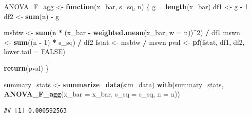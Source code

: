 \documentclass[
]{book}
\newenvironment{Shaded}{\begin{snugshade}}{\end{snugshade}}
\newcommand{\AttributeTok}[1]{\textcolor[rgb]{0.13,0.29,0.53}{#1}}
\newcommand{\ConstantTok}[1]{\textcolor[rgb]{0.56,0.35,0.01}{#1}}
\newcommand{\ControlFlowTok}[1]{\textcolor[rgb]{0.13,0.29,0.53}{\textbf{#1}}}
\newcommand{\DecValTok}[1]{\textcolor[rgb]{0.00,0.00,0.81}{#1}}
\newcommand{\FunctionTok}[1]{\textcolor[rgb]{0.13,0.29,0.53}{\textbf{#1}}}
\newcommand{\NormalTok}[1]{#1}
\newcommand{\OtherTok}[1]{\textcolor[rgb]{0.56,0.35,0.01}{#1}}
\newcommand{\SpecialCharTok}[1]{\textcolor[rgb]{0.81,0.36,0.00}{\textbf{#1}}}
\begin{document}
\begin{Shaded}
\begin{Highlighting}[]
\NormalTok{ANOVA\_F\_agg }\OtherTok{\textless{}{-}} \ControlFlowTok{function}\NormalTok{(x\_bar, s\_sq, n) \{}
\NormalTok{  g }\OtherTok{=} \FunctionTok{length}\NormalTok{(x\_bar)}
\NormalTok{  df1 }\OtherTok{\textless{}{-}}\NormalTok{ g }\SpecialCharTok{{-}} \DecValTok{1}
\NormalTok{  df2 }\OtherTok{\textless{}{-}} \FunctionTok{sum}\NormalTok{(n) }\SpecialCharTok{{-}}\NormalTok{ g}
  
\NormalTok{  msbtw }\OtherTok{\textless{}{-}} \FunctionTok{sum}\NormalTok{(n }\SpecialCharTok{*}\NormalTok{ (x\_bar }\SpecialCharTok{{-}} \FunctionTok{weighted.mean}\NormalTok{(x\_bar, }\AttributeTok{w =}\NormalTok{ n))}\SpecialCharTok{\^{}}\DecValTok{2}\NormalTok{) }\SpecialCharTok{/}\NormalTok{ df1}
\NormalTok{  mswn }\OtherTok{\textless{}{-}} \FunctionTok{sum}\NormalTok{((n }\SpecialCharTok{{-}} \DecValTok{1}\NormalTok{) }\SpecialCharTok{*}\NormalTok{ s\_sq) }\SpecialCharTok{/}\NormalTok{ df2}
\NormalTok{  fstat }\OtherTok{\textless{}{-}}\NormalTok{ msbtw }\SpecialCharTok{/}\NormalTok{ mswn}
\NormalTok{  pval }\OtherTok{\textless{}{-}} \FunctionTok{pf}\NormalTok{(fstat, df1, df2, }\AttributeTok{lower.tail =} \ConstantTok{FALSE}\NormalTok{)}
 
  \FunctionTok{return}\NormalTok{(pval)}
\NormalTok{\}}

\NormalTok{summary\_stats }\OtherTok{\textless{}{-}} \FunctionTok{summarize\_data}\NormalTok{(sim\_data)}
\FunctionTok{with}\NormalTok{(summary\_stats, }\FunctionTok{ANOVA\_F\_agg}\NormalTok{(}\AttributeTok{x\_bar =}\NormalTok{ x\_bar, }\AttributeTok{s\_sq =}\NormalTok{ s\_sq, }\AttributeTok{n =}\NormalTok{ n))}
\end{Highlighting}
\end{Shaded}

\begin{verbatim}
## [1] 0.000592563
\end{verbatim}
\end{document}
